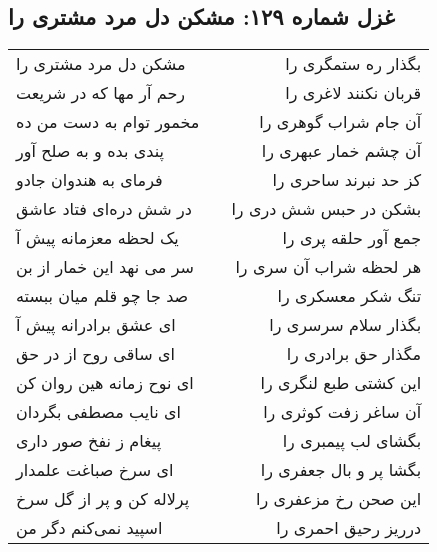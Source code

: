 \begin{center}
\section*{غزل شماره ۱۲۹: مشکن دل مرد مشتری را}
\label{sec:0129}
\begin{longtable}{l p{0.5cm} r}
مشکن دل مرد مشتری را
&&
بگذار ره ستمگری را
\\
رحم آر مها که در شریعت
&&
قربان نکنند لاغری را
\\
مخمور توام به دست من ده
&&
آن جام شراب گوهری را
\\
پندی بده و به صلح آور
&&
آن چشم خمار عبهری را
\\
فرمای به هندوان جادو
&&
کز حد نبرند ساحری را
\\
در شش دره‌ای فتاد عاشق
&&
بشکن در حبس شش دری را
\\
یک لحظه معزمانه پیش آ
&&
جمع آور حلقه پری را
\\
سر می نهد این خمار از بن
&&
هر لحظه شراب آن سری را
\\
صد جا چو قلم میان ببسته
&&
تنگ شکر معسکری را
\\
ای عشق برادرانه پیش آ
&&
بگذار سلام سرسری را
\\
ای ساقی روح از در حق
&&
مگذار حق برادری را
\\
ای نوح زمانه هین روان کن
&&
این کشتی طبع لنگری را
\\
ای نایب مصطفی بگردان
&&
آن ساغر زفت کوثری را
\\
پیغام ز نفخ صور داری
&&
بگشای لب پیمبری را
\\
ای سرخ صباغت علمدار
&&
بگشا پر و بال جعفری را
\\
پرلاله کن و پر از گل سرخ
&&
این صحن رخ مزعفری را
\\
اسپید نمی‌کنم دگر من
&&
درریز رحیق احمری را
\\
\end{longtable}
\end{center}
